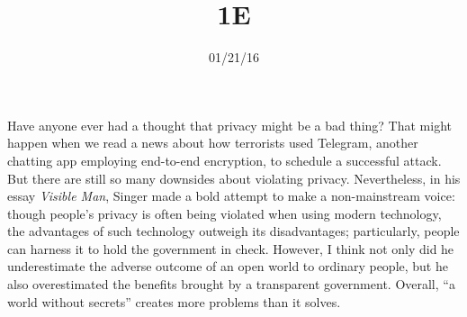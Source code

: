 \documentclass{writing}
\title{1E}
\date{01/21/16}
\begin{document}
\maketitle

Have anyone ever had a thought that privacy might be a bad thing? That
might happen when we read a news about how terrorists used Telegram,
another chatting app employing end-to-end encryption, to schedule a
successful attack. But there are still so many downsides about violating
privacy. Nevertheless, in his essay \emph{Visible Man}, Singer made a
bold attempt to make a non-mainstream voice: though people's privacy is
often being violated when using modern technology, the advantages of
such technology outweigh its disadvantages; particularly, people can
harness it to hold the government in check. However, I think not only
did he underestimate the adverse outcome of an open world to ordinary
people, but he also overestimated the benefits brought by a transparent
government. Overall, ``a world without secrets'' creates more problems
than it solves.
\end{document}
